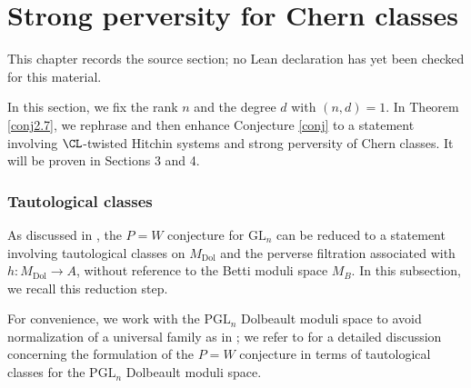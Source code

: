 \chapter{Strong perversity for Chern classes}
\label{pw-conjecture-gl-n-chapter-03}

\begin{remark}
\label{pw-conjecture-gl-n-chapter-03-source}
This chapter records the source section; no Lean declaration has yet been checked for this material.
\notready
\end{remark}

In this section, we fix the rank $n$ and the degree $d$ with $(n,d)=1$. In Theorem \ref{conj2.7}, we rephrase and then enhance Conjecture \ref{conj} to a statement involving $\CL$-twisted Hitchin systems and strong perversity of Chern classes. It will be proven in Sections 3 and 4.

\subsection{Tautological classes}

As discussed in \cite[Section 0.3]{dCMS}, the $P=W$ conjecture for $\mathrm{GL}_n$ can be reduced to a statement involving tautological classes on $M_{\mathrm{Dol}}$ and the perverse filtration associated with $h: M_{\mathrm{Dol}} \to A$, without reference to the Betti moduli space $M_B$. In this subsection, we recall this reduction step.


For convenience, we work with the $\mathrm{PGL}_n$ Dolbeault moduli space to avoid normalization of a universal family as in \cite{dCMS}; we refer to \cite{Shende} for a detailed discussion concerning the formulation of the $P=W$ conjecture in terms of tautological classes for the $\mathrm{PGL}_n$ Dolbeault moduli space.

